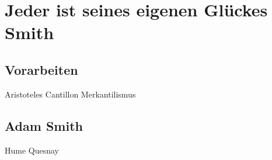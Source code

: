 %
%
%

\chapter{Jeder ist seines eigenen Glückes Smith}
\label{Smith}


\section{Vorarbeiten}
Aristoteles
Cantillon
Merkantilismus

\section{Adam Smith}

Hume
Quesnay

